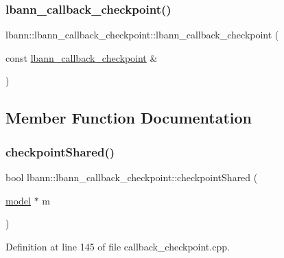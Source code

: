 \subsubsection{\texorpdfstring{lbann\+\_\+callback\+\_\+checkpoint()}{lbann\_callback\_checkpoint()}\hspace{0.1cm}{\footnotesize\ttfamily [2/2]}}
{\footnotesize\ttfamily lbann\+::lbann\+\_\+callback\+\_\+checkpoint\+::lbann\+\_\+callback\+\_\+checkpoint (\begin{DoxyParamCaption}\item[{const \hyperlink{classlbann_1_1lbann__callback__checkpoint}{lbann\+\_\+callback\+\_\+checkpoint} \&}]{ }\end{DoxyParamCaption})\hspace{0.3cm}{\ttfamily [default]}}



\subsection{Member Function Documentation}
\mbox{\label{classlbann_1_1lbann__callback__checkpoint_a23b6f5abb924b2c4d0694e98c7d6f4d5}} 
\subsubsection{\texorpdfstring{checkpoint\+Shared()}{checkpointShared()}}
{\footnotesize\ttfamily bool lbann\+::lbann\+\_\+callback\+\_\+checkpoint\+::checkpoint\+Shared (\begin{DoxyParamCaption}\item[{\hyperlink{classlbann_1_1model}{model} $\ast$}]{m }\end{DoxyParamCaption})}



Definition at line 145 of file callback\+\_\+checkpoint.\+cpp.


